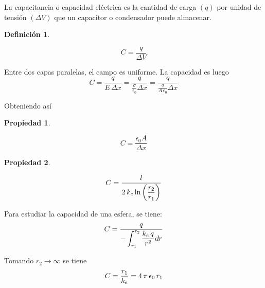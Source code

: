 \documentclass[a5paper,12pt,twoside]{book}
\newtheorem{defn}{{Definición}}[chapter]
\newtheorem{prop}{{Propiedad}}[chapter]
\begin{document}
La capacitancia o capacidad eléctrica es la cantidad de carga $(q)$ por unidad de tensión $(\Delta V)$ que un capacitor o condensador puede almacenar.

\begin{mdframed}[style=MyFrame1]
    \begin{defn}
    \end{defn}
    \begin{equation*}
        C = \frac{q}{\Delta V}
    \end{equation*}
\end{mdframed}

Entre dos capas paralelas, el campo es uniforme. La capacidad es luego
\begin{equation*}
    C = \frac{q}{E \, \Delta x} = \frac{q}{\frac{\sigma}{\epsilon_0}\Delta x} = \frac{q}{\tfrac{q}{A \, \epsilon_0}\Delta x}
\end{equation*}

Obteniendo así

\begin{mdframed}[style=MyFrame1]
    \begin{prop}
    \end{prop}
    \begin{equation*}
        C = \frac{\epsilon_0 A}{\Delta x}
    \end{equation*}
\end{mdframed}

\begin{mdframed}[style=MyFrame1]
    \begin{prop}
    \end{prop}
    \begin{equation*}
        C = \frac{l}{2 \, k_e \ln{\left(\dfrac{r_2}{r_1}\right)}}
    \end{equation*}
\end{mdframed}

Para estudiar la capacidad de una esfera, se tiene:
\begin{equation*}
    C = \frac{q}{-\displaystyle\int_{r_1}^{r_2} \frac{k_e \, q}{r^2} \textsl{d} r}
\end{equation*}

Tomando $r_2 \to \infty$ se tiene
\begin{equation*}
    C = \frac{r_1}{k_e} = 4 \, \pi \, \epsilon_0 \, r_1
\end{equation*}
\end{document}
